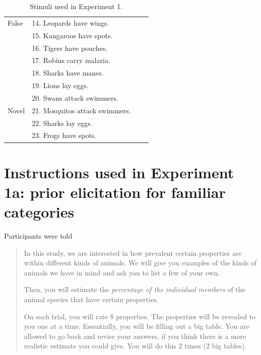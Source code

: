 \documentclass[10pt,letterpaper]{article}
\begin{document}
\begin{table}[h]
\begin{tabular}{| l || l | l | l |}
False                         & 14. Leopards have wings.       &                &                    \\
                                              & 15. Kangaroos have spots.                       &                &                     \\
                                              & 16.  Tigers have pouches.                       &                &                     \\
                                              & 17.  Robins carry malaria.                       &                &                     \\
                                              & 18. Sharks have manes.                       &                &                     \\
                                              & 19. Lions lay eggs.                       &                &                     \\
                                              & 20. Swans attack swimmers.                       &                &                     \\
Novel                         & 21. Mosquitos attack swimmers.       &                &                    \\
                         & 22. Sharks lay eggs.       &                &                    \\
                         & 23. Frogs have spots.       &                &                   \\
\hline

\end{tabular}
\caption{Stimuli used in Experiment 1.}
\label{tab:expt1}
\end{table}


\section{Instructions used in Experiment 1a: prior elicitation for familiar categories}
\label{sec:prior1instruct}

Participants were told 
\begin{quote}
In this study, we are interested in how prevalent certain properties are within different kinds of animals. We will give you examples of the kinds of animals we have in mind and ask you to list a few of your own.

Then, you will estimate the \emph{percentage of the individual members} of the animal species that have certain properties.

On each trial, you will rate 8 properties. The properties will be revealed to you one at a time. Essentially, you will be filling out a big table. You are allowed to go back and revise your answers, if you think there is a more realistic estimate you could give. You will do this 2 times (2 big tables). 

\end{quote}
\end{document}
